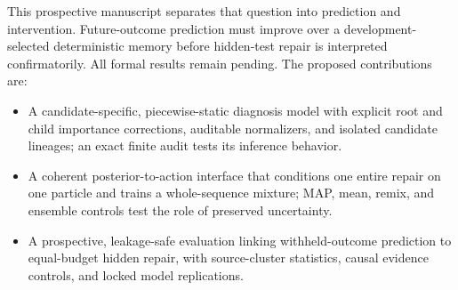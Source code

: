 This prospective manuscript separates that question into prediction and intervention. Future-outcome prediction must improve over a development-selected deterministic memory before hidden-test repair is interpreted confirmatorily. All formal results remain pending. The proposed contributions are:
\begin{itemize}
\item A candidate-specific, piecewise-static diagnosis model with explicit root and child importance corrections, auditable normalizers, and isolated candidate lineages; an exact finite audit tests its inference behavior.
\item A coherent posterior-to-action interface that conditions one entire repair on one particle and trains a whole-sequence mixture; MAP, mean, remix, and ensemble controls test the role of preserved uncertainty.
\item A prospective, leakage-safe evaluation linking withheld-outcome prediction to equal-budget hidden repair, with source-cluster statistics, causal evidence controls, and locked model replications.
\end{itemize}
